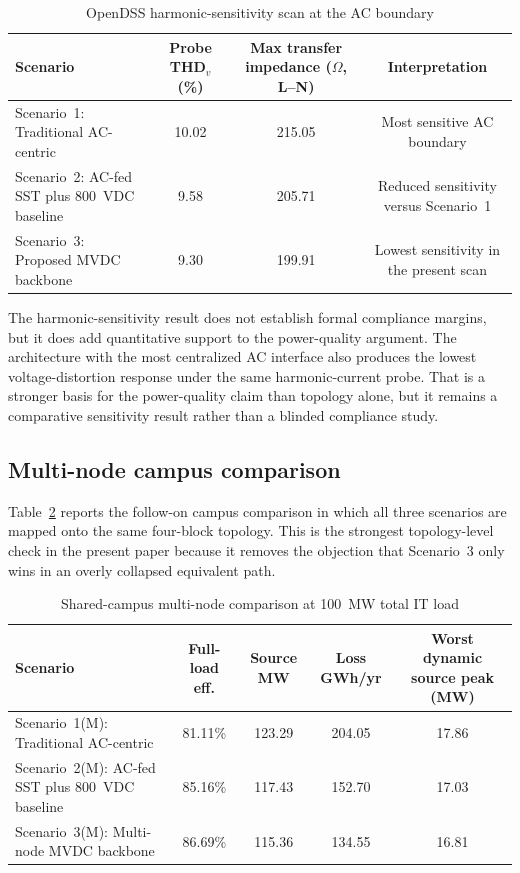 \documentclass[11pt]{article}
\begin{document}
\begin{table}[t]
    \centering
    \caption{OpenDSS harmonic-sensitivity scan at the AC boundary}
    \label{tab:harmonicprobe}
    \begin{tabular}{p{2.25in}ccc}
        \toprule
        Scenario & Probe THD$_v$ (\%) & Max transfer impedance ($\Omega$, L--N) & Interpretation \\
        \midrule
        Scenario~1: Traditional AC-centric & 10.02 & 215.05 & Most sensitive AC boundary \\
        Scenario~2: AC-fed SST plus 800~VDC baseline & 9.58 & 205.71 & Reduced sensitivity versus Scenario~1 \\
        Scenario~3: Proposed MVDC backbone & 9.30 & 199.91 & Lowest sensitivity in the present scan \\
        \bottomrule
    \end{tabular}
\end{table}

The harmonic-sensitivity result does not establish formal compliance margins, but it does add quantitative support to the power-quality argument. The architecture with the most centralized AC interface also produces the lowest voltage-distortion response under the same harmonic-current probe. That is a stronger basis for the power-quality claim than topology alone, but it remains a comparative sensitivity result rather than a blinded compliance study.

\subsection{Multi-node campus comparison}
Table~\ref{tab:multinode} reports the follow-on campus comparison in which all three scenarios are mapped onto the same four-block topology. This is the strongest topology-level check in the present paper because it removes the objection that Scenario~3 only wins in an overly collapsed equivalent path.

\begin{table}[t]
    \centering
    \caption{Shared-campus multi-node comparison at 100~MW total IT load}
    \label{tab:multinode}
    \begin{tabular}{p{2.1in}cccc}
        \toprule
        Scenario & Full-load eff. & Source MW & Loss GWh/yr & Worst dynamic source peak (MW) \\
        \midrule
        Scenario~1(M): Traditional AC-centric & 81.11\% & 123.29 & 204.05 & 17.86 \\
        Scenario~2(M): AC-fed SST plus 800~VDC baseline & 85.16\% & 117.43 & 152.70 & 17.03 \\
        Scenario~3(M): Multi-node MVDC backbone & 86.69\% & 115.36 & 134.55 & 16.81 \\
        \bottomrule
    \end{tabular}
\end{table}
\end{document}
